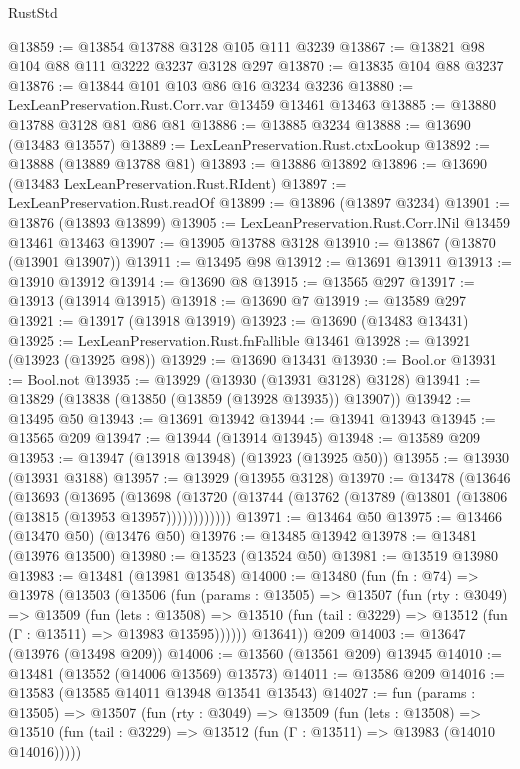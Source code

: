\begin{lexlean}{RustStd}
\begin{coremodule}
@13859 := @13854 @13788 @3128 @105 @111 @3239
@13867 := @13821 @98 @104 @88 @111 @3222 @3237 @3128 @297
@13870 := @13835 @104 @88 @3237
@13876 := @13844 @101 @103 @86 @16 @3234 @3236
@13880 := LexLeanPreservation.Rust.Corr.var @13459 @13461 @13463
@13885 := @13880 @13788 @3128 @81 @86 @81
@13886 := @13885 @3234
@13888 := @13690 (@13483 @13557)
@13889 := LexLeanPreservation.Rust.ctxLookup
@13892 := @13888 (@13889 @13788 @81)
@13893 := @13886 @13892
@13896 := @13690 (@13483 LexLeanPreservation.Rust.RIdent)
@13897 := LexLeanPreservation.Rust.readOf
@13899 := @13896 (@13897 @3234)
@13901 := @13876 (@13893 @13899)
@13905 := LexLeanPreservation.Rust.Corr.lNil @13459 @13461 @13463
@13907 := @13905 @13788 @3128
@13910 := @13867 (@13870 (@13901 @13907))
@13911 := @13495 @98
@13912 := @13691 @13911
@13913 := @13910 @13912
@13914 := @13690 @8
@13915 := @13565 @297
@13917 := @13913 (@13914 @13915)
@13918 := @13690 @7
@13919 := @13589 @297
@13921 := @13917 (@13918 @13919)
@13923 := @13690 (@13483 @13431)
@13925 := LexLeanPreservation.Rust.fnFallible @13461
@13928 := @13921 (@13923 (@13925 @98))
@13929 := @13690 @13431
@13930 := Bool.or
@13931 := Bool.not
@13935 := @13929 (@13930 (@13931 @3128) @3128)
@13941 := @13829 (@13838 (@13850 (@13859 (@13928 @13935)) @13907))
@13942 := @13495 @50
@13943 := @13691 @13942
@13944 := @13941 @13943
@13945 := @13565 @209
@13947 := @13944 (@13914 @13945)
@13948 := @13589 @209
@13953 := @13947 (@13918 @13948) (@13923 (@13925 @50))
@13955 := @13930 (@13931 @3188)
@13957 := @13929 (@13955 @3128)
@13970 := @13478
    (@13646
      (@13693
        (@13695
          (@13698 (@13720 (@13744 (@13762 (@13789 (@13801 (@13806 (@13815 (@13953 @13957))))))))))))
@13971 := @13464 @50
@13975 := @13466 (@13470 @50) (@13476 @50)
@13976 := @13485 @13942
@13978 := @13481 (@13976 @13500)
@13980 := @13523 (@13524 @50)
@13981 := @13519 @13980
@13983 := @13481 (@13981 @13548)
@14000 := @13480
    (fun (fn : @74) =>
    @13978
      (@13503
        (@13506
          (fun (params : @13505) =>
          @13507
            (fun (rty : @3049) =>
            @13509
              (fun (lets : @13508) =>
              @13510 (fun (tail : @3229) => @13512 (fun (Γ : @13511) => @13983 @13595))))))
        @13641))
    @209
@14003 := @13647 (@13976 (@13498 @209))
@14006 := @13560 (@13561 @209) @13945
@14010 := @13481 (@13552 (@14006 @13569) @13573)
@14011 := @13586 @209
@14016 := @13583 (@13585 @14011 @13948 @13541 @13543)
@14027 := fun (params : @13505) =>
  @13507
    (fun (rty : @3049) =>
    @13509
      (fun (lets : @13508) =>
      @13510 (fun (tail : @3229) => @13512 (fun (Γ : @13511) => @13983 (@14010 @14016)))))

\end{coremodule}
\end{lexlean}
